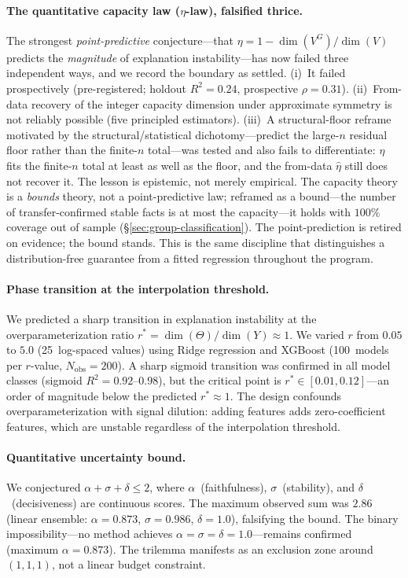 \documentclass[11pt,a4paper]{article}
\begin{document}
\paragraph{The quantitative capacity law ($\eta$-law), falsified thrice.}
The strongest \emph{point-predictive} conjecture---that $\eta = 1 - \dim(V^G)/\dim(V)$
predicts the \emph{magnitude} of explanation instability---has now failed three
independent ways, and we record the boundary as settled. (i)~It failed prospectively
(pre-registered; holdout $R^2 = 0.24$, prospective $\rho = 0.31$). (ii)~From-data recovery
of the integer capacity dimension under approximate symmetry is not reliably possible
(five principled estimators). (iii)~A structural-floor reframe motivated by the
structural/statistical dichotomy---predict the large-$n$ residual floor rather than the
finite-$n$ total---was tested and also fails to differentiate: $\eta$ fits the finite-$n$
total at least as well as the floor, and the from-data $\hat\eta$ still does not recover it.
The lesson is epistemic, not merely empirical. The capacity theory is a \emph{bounds}
theory, not a point-predictive law; reframed as a bound---the number of transfer-confirmed
stable facts is at most the capacity---it holds with $100\%$ coverage out of sample
(\S\ref{sec:group-classification}). The point-prediction is retired on evidence; the bound
stands. This is the same discipline that distinguishes a distribution-free guarantee from a
fitted regression throughout the program.

\paragraph{Phase transition at the interpolation threshold.}
We predicted a sharp transition in explanation instability at the
overparameterization ratio $r^* = \dim(\Theta)/\dim(Y) \approx 1$.  We varied
$r$ from $0.05$ to $5.0$ (25~log-spaced values) using Ridge regression and
XGBoost (100~models per $r$-value, $N_{\text{obs}} = 200$).  A sharp sigmoid
transition was confirmed in all model classes (sigmoid $R^2 = 0.92\text{--}0.98$),
but the critical point is $r^* \in [0.01, 0.12]$---an order of magnitude below
the predicted $r^* \approx 1$.  The design confounds overparameterization with
signal dilution: adding features adds zero-coefficient features, which are
unstable regardless of the interpolation threshold.

\paragraph{Quantitative uncertainty bound.}
We conjectured $\alpha + \sigma + \delta \leq 2$, where $\alpha$~(faithfulness),
$\sigma$~(stability), and $\delta$~(decisiveness) are continuous scores.
The maximum observed sum was $2.86$ (linear ensemble: $\alpha = 0.873$,
$\sigma = 0.986$, $\delta = 1.0$), falsifying the bound.  The binary
impossibility---no method achieves $\alpha = \sigma = \delta = 1.0$---remains
confirmed (maximum $\alpha = 0.873$).  The trilemma manifests as an exclusion
zone around $(1, 1, 1)$, not a linear budget constraint.
\end{document}
